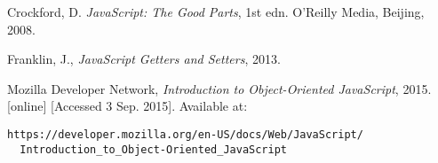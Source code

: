 \documentclass{bioinfo}
\begin{document}
%
%
%
%
%
%
%
%
%

\begin{thebibliography}{}
Crockford, D. \textit{JavaScript: The Good Parts}, 1st edn. O'Reilly Media, Beijing, 2008.

Franklin, J., \textit{JavaScript Getters and Setters}, 2013.

Mozilla Developer Network, \textit{Introduction to Object-Oriented JavaScript}, 2015. [online] 
[Accessed 3 Sep. 2015]. Available at: \begin{lstlisting}
https://developer.mozilla.org/en-US/docs/Web/JavaScript/
  Introduction_to_Object-Oriented_JavaScript
\end{lstlisting} 

\end{thebibliography}
\end{document}
